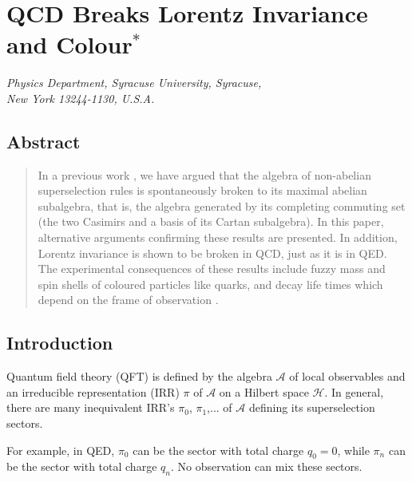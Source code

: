 \chapter[QCD Breaks Lorentz Invariance and Colour]{QCD Breaks Lorentz Invariance and Colour$^{*}$}\label{chap1}



\begin{center}
\textit{Physics Department, Syracuse University, Syracuse,}\\ 
\textit{New York 13244-1130, U.S.A.}
\end{center}


\section*{Abstract}

\begin{quote}
In a previous work \cite{key1}, we have argued that the algebra of non-abelian superselection rules is spontaneously broken to its maximal abelian subalgebra, that is, the algebra generated by its completing commuting set (the two Casimirs and a basis of its Cartan subalgebra). In this paper, alternative arguments confirming these results are presented. In addition, Lorentz invariance is shown to be broken in QCD, just as it is in QED. The experimental consequences of these results include fuzzy mass and spin shells of coloured particles like quarks, and decay life times which depend on the frame of observation \cite{key2,key3,key4}.
\end{quote}

\section{Introduction}\label{chap1-sec1}

Quantum field theory (QFT) is defined by the algebra $\mathcal{A}$ of local observables and an irreducible representation (IRR) $\pi$ of $\mathcal{A}$ on a Hilbert space $\mathcal{H}$. In general, there are many inequivalent IRR's $\pi_{0}$, $\pi_{1}$,... of $\mathcal{A}$ defining its superselection sectors.

For example, in QED, $\pi_{0}$ can be the sector with total charge $q_{0}= 0$, while $\pi_{n}$ can be the sector with total charge $q_{n}$. No observation can mix these sectors.

